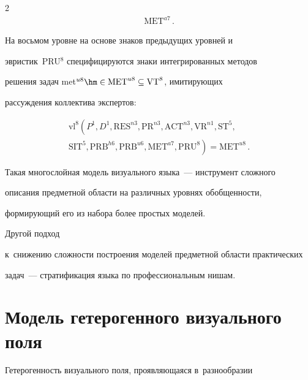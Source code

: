\begin{multicols}{2}
\begin{multline*}
\mathrm{MET}^{a7}\,.


  \end{multline*}


  


  На восьмом уровне на основе знаков предыдущих уровней и~


эвристик~PRU$^8$ специфицируются знаки интегрированных методов 


решения задач met$^{u8}\hm\in \mathrm{MET}^{u8}\subseteq \mathrm{VT}^8$, имитирующих 


рассуждения коллектива экспертов:


  \begin{multline*}


  \mathrm{vl}^8\!\left( P^1, D^1, \mathrm{RES}^{n3}, \mathrm{PR}^{n3},


  \mathrm{ACT}^{n3}, \mathrm{VR}^{n1}, \mathrm{ST}^5,\right.\\


\left.   \mathrm{SIT}^5, 


\mathrm{PRB}^{h6}, \mathrm{PRB}^{u6}, \mathrm{MET}^{a7}, \mathrm{PRU}^8\right)=


 \mathrm{MET}^{u8}\,.


  \end{multline*}


  


  Такая многослойная модель визуального языка~--- инструмент сложного 


описания предметной области на различных уровнях обобщенности, 


формирующий его из набора более простых моделей. 





Другой подход 


к~снижению сложности по\-стро\-ения моделей предметной области практических 


задач~--- стратификация языка по профессиональным нишам.


  


\section{Модель гетерогенного визуального поля}





  Гетерогенность визуального поля, проявляющаяся в~разнообразии 



\end{multicols}
